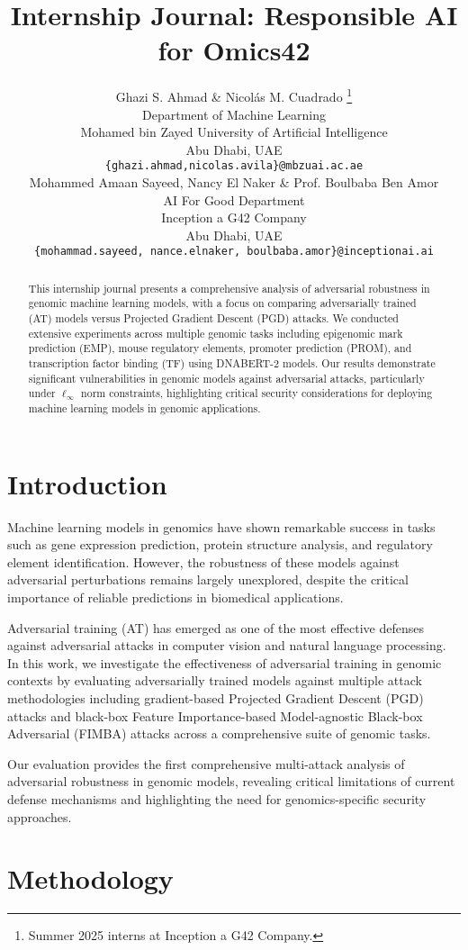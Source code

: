 \documentclass{article} %
\title{Internship Journal: Responsible AI for Omics42}
\author{Ghazi S. Ahmad \& Nicolás M. Cuadrado \thanks{Summer 2025 interns at Inception a G42 Company.} \\
    Department of Machine Learning\\
    Mohamed bin Zayed University of Artificial Intelligence\\
    Abu Dhabi, UAE \\
    \texttt{\{ghazi.ahmad,nicolas.avila\}@mbzuai.ac.ae} \\
    \AND
    Mohammed Amaan Sayeed, Nancy El Naker \& Prof. Boulbaba Ben Amor \\
    AI For Good Department\\
    Inception a G42 Company \\
    Abu Dhabi, UAE \\
    \texttt{\{mohammad.sayeed, nance.elnaker, boulbaba.amor\}@inceptionai.ai} \\
    }
\begin{document}
\maketitle

\begin{abstract}
This internship journal presents a comprehensive analysis of adversarial robustness in genomic machine learning models, with a focus on comparing adversarially trained (AT) models versus Projected Gradient Descent (PGD) attacks. We conducted extensive experiments across multiple genomic tasks including epigenomic mark prediction (EMP), mouse regulatory elements, promoter prediction (PROM), and transcription factor binding (TF) using DNABERT-2 models. Our results demonstrate significant vulnerabilities in genomic models against adversarial attacks, particularly under $\ell_\infty$ norm constraints, highlighting critical security considerations for deploying machine learning models in genomic applications.
\end{abstract}

\section{Introduction}

Machine learning models in genomics have shown remarkable success in tasks such as gene expression prediction, protein structure analysis, and regulatory element identification. However, the robustness of these models against adversarial perturbations remains largely unexplored, despite the critical importance of reliable predictions in biomedical applications.

Adversarial training (AT) has emerged as one of the most effective defenses against adversarial attacks in computer vision and natural language processing. In this work, we investigate the effectiveness of adversarial training in genomic contexts by evaluating adversarially trained models against multiple attack methodologies including gradient-based Projected Gradient Descent (PGD) attacks and black-box Feature Importance-based Model-agnostic Black-box Adversarial (FIMBA) attacks across a comprehensive suite of genomic tasks.

Our evaluation provides the first comprehensive multi-attack analysis of adversarial robustness in genomic models, revealing critical limitations of current defense mechanisms and highlighting the need for genomics-specific security approaches.

\section{Methodology}
\end{document}
